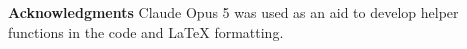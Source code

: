 \documentclass[letterpaper, 10 pt, conference]{ieeeconf}
\begin{document}

\textbf{Acknowledgments} Claude Opus 5 was used as an aid to develop helper functions in the code and LaTeX formatting.



\end{document}
